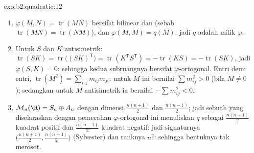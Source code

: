 \begin{solution}{exo:b2:quadratic:12}
\begin{enumerate}
  \item $\varphi(M, N) = \operatorname{tr}(MN)$ bersifat bilinear dan
         (sebab $\operatorname{tr}(MN) =
        \operatorname{tr}(NM)$), dan $\varphi(M, M) = q(M)$:
        jadi $q$ adalah  milik $\varphi$.
  \item Untuk $S$  dan $K$ antisimetrik:
        $\operatorname{tr}(SK) =
        \operatorname{tr}\bigl((SK)^{\mathsf T}\bigr) =
        \operatorname{tr}(K^{\mathsf T}S^{\mathsf T}) =
        -\operatorname{tr}(KS) = -\operatorname{tr}(SK)$, jadi
        $\varphi(S, K) = 0$: sehingga kedua subruangnya bersifat
        $\varphi$-ortogonal. Entri demi entri, $\operatorname{tr}
        (M^2) = \sum_{i,j} m_{ij}m_{ji}$: untuk $M$ 
        ini bernilai $\sum m_{ij}^2 > 0$ (bila $M \neq 0$); sedangkan untuk
        $M$ antisimetrik ia bernilai $-\sum m_{ij}^2 < 0$.
  \item $\mathcal M_n(\R) = S_n \oplus A_n$ dengan dimensi
        $\frac{n(n+1)}2$ dan $\frac{n(n-1)}2$; jadi sebuah  yang diselaraskan dengan pemecahan
        $\varphi$-ortogonal ini menuliskan $q$ sebagai $\frac{n(n+1)}2$
        kuadrat positif dan $\frac{n(n-1)}2$ kuadrat negatif: jadi signaturnya
        $\bigl(\frac{n(n+1)}2, \frac{n(n-1)}2\bigr)$
        (Sylvester) dan ranknya $n^2$: sehingga bentuknya tak merosot.
\end{enumerate}
\end{solution}


